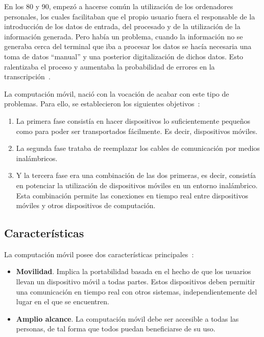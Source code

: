 En los 80 y 90, empezó a hacerse común la utilización de los ordenadores
personales, los cuales facilitaban que el propio usuario fuera el responsable
de la introducción de los datos de entrada, del procesado y de la utilización
de la información generada. Pero había un problema, cuando la información no
se generaba cerca del terminal que iba a procesar los datos se hacía necesaria
una toma de datos ``manual'' y una posterior digitalización de dichos datos.
Esto ralentizaba el proceso y aumentaba la probabilidad de errores en la
transcripción~\cite{bib:micMobileComputing}.

La computación móvil, nació con la vocación de acabar con este tipo de 
problemas. Para ello, se establecieron los siguientes
objetivos~\cite{bib:ticUTP}:
\begin{enumerate}
\item La primera fase consistía en hacer dispositivos lo suficientemente
pequeños como para poder ser transportados fácilmente. Es decir, dispositivos
móviles.
\item La segunda fase trataba de reemplazar los cables de comunicación por
medios inalámbricos.
\item Y la tercera fase era una combinación de las dos primeras, es decir,
consistía en potenciar la utilización de dispositivos móviles en un entorno
inalámbrico. Esta combinación permite las conexiones en tiempo real entre
dispositivos móviles y otros dispositivos de computación.
\end{enumerate}

  \subsection{Características}
La computación móvil posee dos características principales~\cite{bib:ticUTP}:
\begin{itemize}
\item \textbf{Movilidad}. Implica la portabilidad basada en el hecho de que
los usuarios llevan un dispositivo móvil a todas partes. Estos dispositivos
deben permitir una comunicación en tiempo real con otros sistemas,
independientemente del lugar en el que se encuentren.
\item \textbf{Amplio alcance}. La computación móvil debe ser accesible a todas
las personas, de tal forma que todos puedan beneficiarse de su uso.
\end{itemize}

